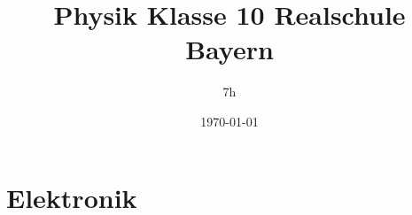\documentclass[a4paper, 12pt]{scrartcl}
\title{Physik Klasse 10 Realschule Bayern}
\date{\today}
\author{7h}
\begin{document}
    \maketitle
    \tableofcontents
    \section {Elektronik}
    
\end{document}
